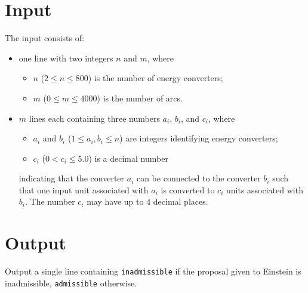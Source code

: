 \section*{Input}
The input consists of:
\begin{itemize}
	\item one line with two integers $n$ and $m$, where
		\begin{itemize}
			\item $n$ ($2\leq n \leq 800$) is the number of energy converters;
			\item $m$ ($0 \leq m \leq 4000$) is the number of arcs.
		\end{itemize}
	\item $m$ lines each containing three numbers $a_i$, $b_i$, and $c_i$, where
		\begin{itemize}
			\item $a_i$ and $b_i$ ($1 \leq a_i, b_i \leq n$) are integers identifying energy converters;
			\item $c_i$ ($0 < c_i \leq 5.0$) is a decimal number
    \end{itemize}
    indicating that the converter $a_i$ can be connected to the converter $b_i$ such that one input unit associated with $a_i$ is converted to $c_i$ units associated with $b_i$. The number $c_i$ may have up to $4$ decimal places.
\end{itemize}


\section*{Output}

Output a single line containing \texttt{inadmissible} if the proposal given to Einstein is inadmissible, \texttt{admissible} otherwise. 
